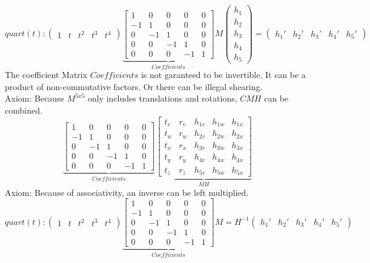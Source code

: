 \documentclass[a4paper,landscape]{report}
\begin{document}
\begin{equation}
quart(t):
\begin{pmatrix}
1 & t & t^2 & t^3 & t^4
\end{pmatrix}
\underbrace{\begin{bmatrix}
1 & 0 & 0 & 0 & 0\\
-1 & 1 & 0 & 0 & 0\\
0 & -1 &1 & 0 & 0\\
0 & 0 & -1 & 1 & 0\\
0 & 0 & 0 & -1 & 1
\end{bmatrix}}_{Coefficients}
M
\begin{pmatrix}
h_{1} \\
h_{2} \\
h_{3} \\
h_{4} \\
h_{5}
\end{pmatrix}
=
\begin{pmatrix}
h_{1}' & h_{2}' & h_{3}' & h_{4}' & h_{5}'
\end{pmatrix}
\end{equation}
The coefficient Matrix $Coefficients$ is not garanteed to be invertible. It can be a product of non-commutative factors. Or there can be illegal shearing.\\
Axiom: Because $M^{5x5}$ only includes translations and rotations, $CMH$ can be combined.
\begin{equation}
\underbrace{\begin{bmatrix}
1 & 0 & 0 & 0 & 0\\
-1 & 1 & 0 & 0 & 0\\
0 & -1 &1 & 0 & 0\\
0 & 0 & -1 & 1 & 0\\
0 & 0 & 0 & -1 & 1
\end{bmatrix}}_{Coefficients}
\underbrace{\begin{bmatrix}
t_{v} & r_{v} & h_{1v} & h_{1w} & h_{1x}\\
t_{w} & r_{w} & h_{2v} & h_{2w} & h_{2x}\\
t_{x} & r_{x} & h_{3v} & h_{3w} & h_{3x}\\
t_{y} & r_{y} & h_{4v} & h_{4w} & h_{4x}\\
t_{z} & r_{z} & h_{5v} & h_{5w} & h_{5x}
\end{bmatrix}}_{MH}
\end{equation}
Axiom: Because of associativity, an inverse can be left multiplied.
\begin{equation}
quart(t):
\begin{pmatrix}
1 & t & t^2 & t^3 & t^4
\end{pmatrix}
\underbrace{\begin{bmatrix}
1 & 0 & 0 & 0 & 0\\
-1 & 1 & 0 & 0 & 0\\
0 & -1 &1 & 0 & 0\\
0 & 0 & -1 & 1 & 0\\
0 & 0 & 0 & -1 & 1
\end{bmatrix}}_{Coefficients}
M
=
H^{-1}
\begin{pmatrix}
h_{1}' & h_{2}' & h_{3}' & h_{4}' & h_{5}'
\end{pmatrix}
\end{equation}
\end{document}
